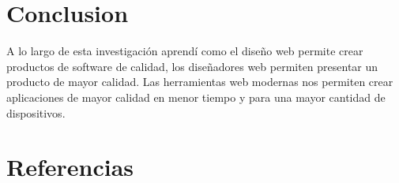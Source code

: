 \documentclass[11pt]{article}
\begin{document}
\section{Conclusion}
\label{sec:orga39e886}
A lo largo de esta investigación aprendí como el diseño web permite crear 
productos de software de calidad, los diseñadores web permiten presentar
un producto de mayor calidad. Las herramientas web modernas nos permiten crear
aplicaciones de mayor calidad en menor tiempo y para una mayor cantidad de 
dispositivos.


\section{Referencias}
\label{sec:orgce28412}
\printbibliography[heading=none]
\end{document}

